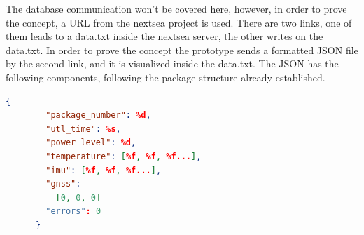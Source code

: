 The database communication won't be covered here, however, in order to prove the concept, a URL from the 
nextsea project is used. There are two links, one of them leads to a data.txt inside the nextsea server, 
the other writes on the data.txt. In order to prove the concept the prototype sends a formatted JSON file by the
second link, and it is visualized inside the data.txt. The JSON has the following components, following the 
package structure already established.
\\
\begin{lstlisting}[language=json]
    {
        "package_number": %d,
        "utl_time": %s,
        "power_level": %d,
        "temperature": [%f, %f, %f...],
        "imu": [%f, %f, %f...],
        "gnss": 
          [0, 0, 0]
        "errors": 0
      }
\end{lstlisting}

